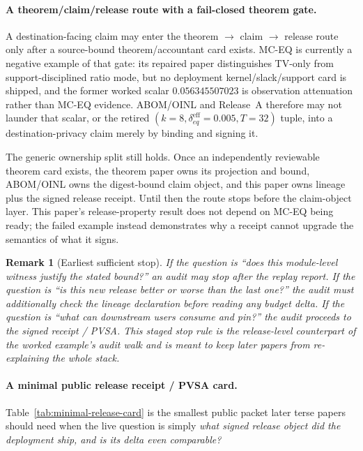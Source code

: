 \documentclass[11pt]{article}
\newtheorem{remark}{Remark}
\begin{document}
\paragraph{A theorem/claim/release route with a fail-closed theorem gate.}
A destination-facing claim may enter the theorem $\to$ claim $\to$ release route only after a source-bound theorem/accountant card exists.  MC-EQ is currently a negative example of that gate: its repaired paper distinguishes TV-only from support-disciplined ratio mode, but no deployment kernel/slack/support card is shipped, and the former worked scalar $0.056345507023$ is observation attenuation rather than MC-EQ evidence.  ABOM/OINL and Release~A therefore may not launder that scalar, or the retired $(k=8,\delta_{eq}^{\mathrm{eff}}=0.005,T=32)$ tuple, into a destination-privacy claim merely by binding and signing it.

The generic ownership split still holds.  Once an independently reviewable theorem card exists, the theorem paper owns its projection and bound, ABOM/OINL owns the digest-bound claim object, and this paper owns lineage plus the signed release receipt.  Until then the route stops before the claim-object layer.  This paper's release-property result does not depend on MC-EQ being ready; the failed example instead demonstrates why a receipt cannot upgrade the semantics of what it signs.\cite{series:abom,series:releaseproperty,series:theoremtopublicationspine}

\begin{remark}[Earliest sufficient stop]
If the question is ``does this module-level witness justify the stated bound?'' an audit may stop after the replay report.
If the question is ``is this new release better or worse than the last one?'' the audit must additionally check the lineage declaration before reading any budget delta.
If the question is ``what can downstream users consume and pin?'' the audit proceeds to the signed receipt / PVSA.
This staged stop rule is the release-level counterpart of the worked example's audit walk and is meant to keep later papers from re-explaining the whole stack.
\end{remark}

\paragraph{A minimal public release receipt / PVSA card.}
Table~\ref{tab:minimal-release-card} is the smallest public packet later terse papers should need when the live question is simply \emph{what signed release object did the deployment ship, and is its delta even comparable?}
\end{document}
